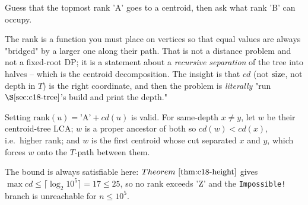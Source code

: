 \begin{attemptgate}
Guess that the topmost rank 'A' goes to a centroid, then ask what rank 'B' can
occupy. 
\end{attemptgate}

The rank is a function you must place on vertices so that equal values are always
"bridged" by a larger one along their path. That is not a distance problem and not
a fixed-root DP; it is a statement about a \emph{recursive separation} of the tree
into halves -- which is the centroid decomposition. The insight is that
\(\mathit{cd}\) (not \(\operatorname{size}\), not depth in \(T\)) is the right coordinate, and
then the problem is \emph{literally} "run \(\secref{c18-tree}\)'s build and print
the depth."

\begin{observation}
Setting \(\mathrm{rank}(u)=\text{'A'}+\mathit{cd}(u)\) is valid. For same-depth
\(x\ne y\), let \(w\) be their centroid-tree LCA; \(w\) is a proper ancestor of
both so \(\mathit{cd}(w)<\mathit{cd}(x)\), i.e.\ higher rank; and \(w\) is the first
centroid whose cut separated \(x\) and \(y\), which forces \(w\) onto the
\(T\)-path between them.
\end{observation}
\begin{observation}
The bound is always satisfiable here: \(\thmref{c18-height}\) gives
\(\max\mathit{cd}\le\lceil\log_2 10^5\rceil=17\le 25\), so no rank exceeds 'Z' and
the \texttt{Impossible!} branch is unreachable for \(n\le 10^5\).
\end{observation}

